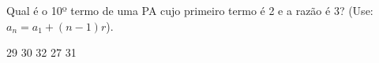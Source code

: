 Qual é o 10º termo de uma PA cujo primeiro termo é 2 e a razão é 3? (Use: $a_n=a_1+(n-1)r$).

29
30
32
27
31





